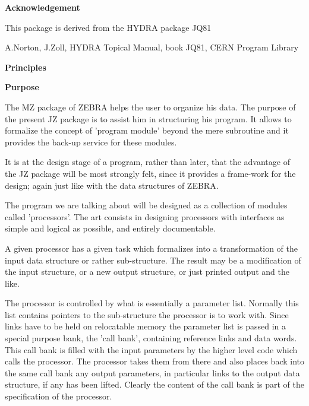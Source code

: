 \newpage
\vspace*{40pt}
{\large\bf Acknowledgement}

This package is derived from the HYDRA package JQ81

A.Norton, J.Zoll, HYDRA Topical Manual, book JQ81, CERN Program Library
\cleardoublepage  %
\vspace*{20pt}
\lile{8mm}
\begin{center}
  {\large\bf{Principles}}\\
\end{center}
\lspa

\vspace*{2pt}
{\large\bf Purpose}

The MZ package of ZEBRA helps the user to organize his data.
The purpose of the present JZ package is to assist him
in structuring his program.
It allows to formalize the concept of 'program module'
beyond the mere subroutine
and it provides the back-up service for these modules.

It is at the design stage of a program,
rather than later,
that the advantage of the JZ package will be most strongly felt,
since it provides a frame-work for the design;
again just like with the data structures of ZEBRA.

The program we are talking about will be designed as
a collection of modules called 'processors'.
The art consists in designing processors with interfaces
as simple and logical as possible,
and entirely documentable.

A given processor has a given task
which formalizes into a transformation of the input data structure
or rather sub-structure.
The result may be a modification of the input structure,
or a new output structure,
or just printed output and the like.

The processor is controlled by what is essentially a parameter list.
Normally this list contains pointers to the sub-structure
the processor is to work with.
Since links have to be held on relocatable memory
the parameter list is passed in a special purpose bank,
the 'call bank',
containing reference links and data words.
This call bank is filled with the input parameters
by the higher level code which calls the processor.
The processor takes them from there and also places back
into the same call bank any output parameters,
in particular links to the output data structure,
if any has been lifted.
Clearly the content of the call bank is part of
the specification of the processor.

